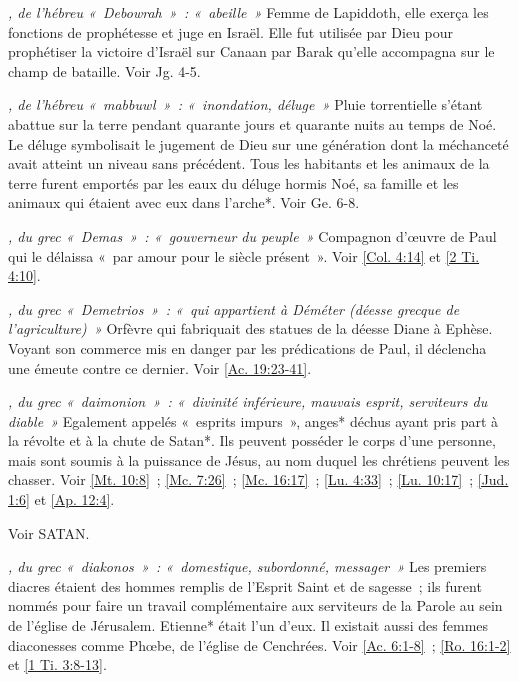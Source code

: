 \begin{multicols}{2}
\textit{, de l'hébreu «~Debowrah~»~: «~abeille~»}\newline
Femme de Lapiddoth, elle exerça les fonctions de prophétesse et juge en Israël. Elle fut utilisée par Dieu pour prophétiser la victoire d'Israël sur Canaan par Barak qu'elle accompagna sur le champ de bataille. Voir Jg. 4-5.

\textit{, de l'hébreu «~mabbuwl~»~: «~inondation, déluge~»}\newline
Pluie torrentielle s'étant abattue sur la terre pendant quarante jours et quarante nuits au temps de Noé. Le déluge symbolisait le jugement de Dieu sur une génération dont la méchanceté avait atteint un niveau sans précédent. Tous les habitants et les animaux de la terre furent emportés par les eaux du déluge hormis Noé, sa famille et les animaux qui étaient avec eux dans l'arche*. Voir Ge. 6-8.

\textit{, du grec «~Demas~»~: «~gouverneur du peuple~»}\newline
Compagnon d'œuvre de Paul qui le délaissa «~par amour pour le siècle présent~». Voir \vref{Col. 4:14} et \vref{2 Ti. 4:10}.

\textit{, du grec «~Demetrios~»~: «~qui appartient à Déméter (déesse grecque de l'agriculture)~»}\newline
Orfèvre qui fabriquait des statues de la déesse Diane à Ephèse. Voyant son commerce mis en danger par les prédications de Paul, il déclencha une émeute contre ce dernier. Voir \vref{Ac. 19:23-41}.

\textit{, du grec «~daimonion~»~: «~divinité inférieure, mauvais esprit, serviteurs du diable~»}\newline
Egalement appelés «~esprits impurs~», anges* déchus ayant pris part à la révolte et à la chute de Satan*. Ils peuvent posséder le corps d'une personne, mais sont soumis à la puissance de Jésus, au nom duquel les chrétiens peuvent les chasser. Voir \vref{Mt. 10:8}~; \vref{Mc. 7:26}~; \vref{Mc. 16:17}~; \vref{Lu. 4:33}~; \vref{Lu. 10:17}~; \vref{Jud. 1:6} et \vref{Ap. 12:4}.

\textit{}\newline
Voir SATAN.

\textit{, du grec «~diakonos~»~: «~domestique, subordonné, messager~»}\newline
Les premiers diacres étaient des hommes remplis de l'Esprit Saint et de sagesse~; ils furent nommés pour faire un travail complémentaire aux serviteurs de la Parole au sein de l'église de Jérusalem. Etienne* était l'un d'eux. Il existait aussi des femmes diaconesses comme Phœbe, de l'église de Cenchrées. Voir \vref{Ac. 6:1-8}~; \vref{Ro. 16:1-2} et \vref{1 Ti. 3:8-13}.


\end{multicols}
